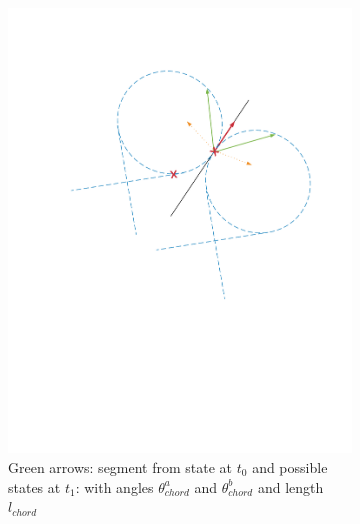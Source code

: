 \begin{itemize}
\begin{figure}[!htbp]
    \begin{subfigure}[b]{0.45\textwidth}
        \includegraphics[width=\textwidth]{img/circular_movment5.pdf}
        \caption{Green arrows: segment from state at $t_0$ and possible states at $t_1$: with angles $\theta_{chord}^a$  and $\theta_{chord}^b$ and length $l_{chord}$ }
        \label{fig:five}
   \end{subfigure}\hfill
    \begin{subfigure}[b]{0.45\textwidth}

\end{subfigure}
\end{figure}
\end{itemize}
